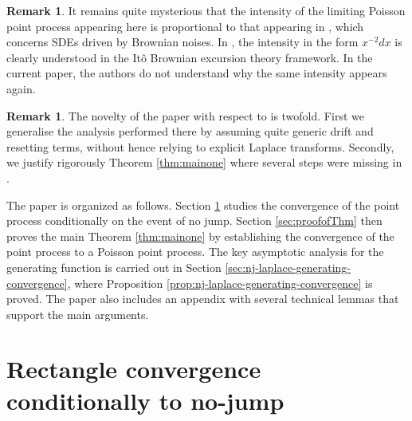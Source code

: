\documentclass[reqno, 12pt, a4paper]{amsart}
\theoremstyle{plain}
\theoremstyle{definition}
\newtheorem{remark}[theorem]{Remark}
\begin{document}
\begin{remark}
It remains quite mysterious that the intensity of the limiting Poisson point process appearing here is proportional to that appearing in \cite{BCCNP23}, which concerns SDEs driven by Brownian noises. In \cite{BCCNP23}, the intensity in the form $x^{-2} dx$ is clearly understood in the It\^o Brownian excursion theory framework. In the current paper, the authors do not understand why the same intensity appears again.
\end{remark}

\begin{remark}
The novelty of the paper with respect to \cite{SBDKC25} is twofold. First we generalise the analysis performed there by assuming quite generic drift and resetting terms, without hence relying to explicit Laplace transforms. Secondly, we justify rigorously Theorem \ref{thm:mainone} where several steps were missing in \cite{SBDKC25}.
\end{remark}

\bigskip

The paper is organized as follows. Section \ref{sec:convfiniterectangles} studies the convergence of the point process conditionally on the event of no jump. Section \ref{sec:proofofThm} then proves the main Theorem \ref{thm:mainone} by establishing the convergence of the point process to a Poisson point process. The key asymptotic analysis for the generating function is carried out in Section \ref{sec:nj-laplace-generating-convergence}, where Proposition \ref{prop:nj-laplace-generating-convergence} is proved. The paper also includes an appendix with several technical lemmas that support the main arguments.



\section{Rectangle convergence conditionally to no-jump}
\label{sec:convfiniterectangles}
\end{document}
